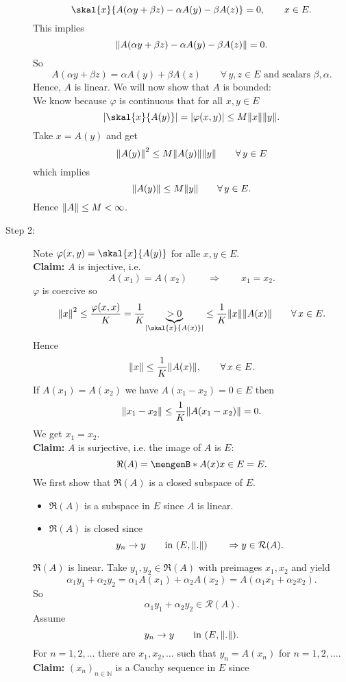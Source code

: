 \begin{beweis}
\begin{description}
		\[
			\skal{x}{A(\alpha y + \beta z)- \alpha A(y) - \beta A(z)} = 0, \qquad  x \in E.
		\]
		This implies 
		\[
			\norm{A(\alpha y + \beta z) - \alpha A(y) - \beta A(z)} = 0.
		\]
		So \[
			A( \alpha y+ \beta z) = \alpha A(y) + \beta A(z) \qquad \forall\, y,z \in E \text{ and scalars }\beta,\alpha.
		\]
		Hence, $A$ is linear. We will now show that $A$ is bounded: \\
		We know because $\varphi$ is continuous that for all $x,y \in E$
		\[
			\abs{\skal{x}{A(y)}} = \abs{\varphi(x,y)} \leq M \norm{x} \norm{y}.
		\]
		Take $x = A(y)$ and get
		\[
			\norm{A(y)}^2 \leq  M \norm{A(y)} \norm{y} \qquad \forall\, y \in E
		\]
		which implies
		\[
			\norm{A(y)} \leq M \norm{y} \qquad \forall\, y \in E.
		\]
		Hence $\norm{A} \leq M < \infty$.
		\item[Step 2:] Note $\varphi(x,y) = \skal{x}{A(y)}$ for alle $x,y \in E$. \\
		\textbf{Claim:} \text{    }$A$ is injective, i.e.
		\[
			A(x_1) = A(x_2) \qquad \Rightarrow \qquad x_1 = x_2.
 		\]
		$\varphi$ is coercive so
		\[
			\norm{x}^2 \leq \frac{\varphi(x,x)}{K} = \frac{1}{K} \underset{\abs{\skal{x}{A(x)}}}{\underbrace{>0}} \leq \frac{1}{K} \norm{x} \norm{A(x)} \qquad \forall\,  x \in E.
		\]
		Hence \[
			\norm{x} \leq  \frac{1}{K} \norm{A(x)}, \qquad \forall\, x \in E.
		\]
		If $A(x_1) = A(x_2)$ we have $A(x_1-x_2) = 0 \in E$ then
		\[
			\norm{x_1 - x_2} \leq \frac{1}{K} \norm{A(x_1 -x_2)} = 0.
		\]
		We get $x_1 = x_2$. \\
		\textbf{Claim:} \text{    }$A$ is surjective, i.e. the image of $A$ is $E$: \[
			\Re(A) = \set[A(x)]{x \in E} = E.
		\] 
		We first show that $\Re(A)$ is a closed subspace of $E$. 
		\begin{itemize}
			\item $\Re(A)$ is a subspace in $E$ since $A$ is linear.
			\item $\Re(A)$ is closed since
			\[
				y_n \to y \qquad \text{in }(E, \norm{.}) \qquad \Rightarrow y \in \mathcal{R}(A).
			\]			
		\end{itemize}
		$\Re(A)$ is linear. Take $y_1,y_2 \in \Re(A)$ with preimages $x_1,x_2$ and yield
		\[
			\alpha_1 y_1 + \alpha_2 y_2 = \alpha_1 A(x_1) + \alpha_2 A(x_2) = A(\alpha_1 x_1 + \alpha_2 x_2).
		\]
		So \[
			\alpha_1 y_1 + \alpha_2 y_2 \in \mathcal{R}(A).
		\]
		Assume \[
			y_n \to y \qquad \text{in }(E, \norm{.}).
		\]
		For $n=1,2,\dots$ there are $x_1,x_2,\dots$ such that $y_n= A(x_n)$ for $n=1,2,\dots$. \\
		\textbf{Claim:} \text{    }$(x_n)_{n \in \mathbb{N}}$ is a Cauchy sequence in $E$ since

\end{description}
\end{beweis}
